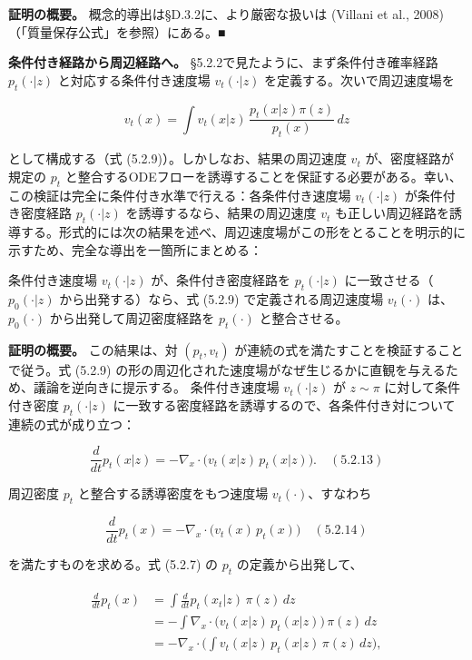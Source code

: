 \textbf{証明の概要。} 概念的導出は§D.3.2に、より厳密な扱いは (Villani et al., 2008)（「質量保存公式」を参照）にある。■

\textbf{条件付き経路から周辺経路へ。} §5.2.2で見たように、まず条件付き確率経路 $p_t(\cdot|z)$ と対応する条件付き速度場 $v_t(\cdot|z)$ を定義する。次いで周辺速度場を

\[
v_t(x)=\int v_t(x|z)\,\frac{p_t(x|z)\pi(z)}{p_t(x)}\,dz
\]


として構成する（式 (5.2.9)）。しかしなお、結果の周辺速度 $v_t$ が、密度経路が規定の $p_t$ と整合するODEフローを誘導することを保証する必要がある。幸い、この検証は完全に条件付き水準で行える：各条件付き速度場 $v_t(\cdot|z)$ が条件付き密度経路 $p_t(\cdot|z)$ を誘導するなら、結果の周辺速度 $v_t$ も正しい周辺経路を誘導する。形式的には次の結果を述べ、周辺速度場がこの形をとることを明示的に示すため、完全な導出を一箇所にまとめる：

\begin{propositionbox}[命題 5.2.3（周辺速度場は与えられた周辺密度を生成する）]
条件付き速度場 $v_t(\cdot|z)$ が、条件付き密度経路を $p_t(\cdot|z)$ に一致させる（$p_0(\cdot|z)$ から出発する）なら、式 (5.2.9) で定義される周辺速度場 $v_t(\cdot)$ は、$p_0(\cdot)$ から出発して周辺密度経路を $p_t(\cdot)$ と整合させる。
\end{propositionbox}


\textbf{証明の概要。} この結果は、対 $(p_t,v_t)$ が連続の式を満たすことを検証することで従う。式 (5.2.9) の形の周辺化された速度場がなぜ生じるかに直観を与えるため、議論を逆向きに提示する。
条件付き速度場 $v_t(\cdot|z)$ が $z\sim\pi$ に対して条件付き密度 $p_t(\cdot|z)$ に一致する密度経路を誘導するので、各条件付き対について連続の式が成り立つ：

\[
\frac{d}{dt}p_t(x|z)=-\nabla_x\cdot\bigl(v_t(x|z)\,p_t(x|z)\bigr). \quad (5.2.13)
\]


周辺密度 $p_t$ と整合する誘導密度をもつ速度場 $v_t(\cdot)$、すなわち

\[
\frac{d}{dt}p_t(x)=-\nabla_x\cdot\bigl(v_t(x)\,p_t(x)\bigr) \quad (5.2.14)
\]


を満たすものを求める。式 (5.2.7) の $p_t$ の定義から出発して、

\begin{align*}
\begin{aligned}
\frac{d}{dt}p_t(x)
&=\int\frac{d}{dt}p_t(x_t|z)\,\pi(z)\,dz \\
&=-\int\nabla_x\cdot\bigl(v_t(x|z)\,p_t(x|z)\bigr)\,\pi(z)\,dz \\
&=-\nabla_x\cdot\Biggl(\int v_t(x|z)\,p_t(x|z)\,\pi(z)\,dz\Biggr),
\end{aligned}
\end{align*}



